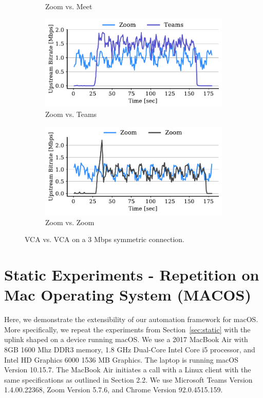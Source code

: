 \begin{figure}[]
\begin{subfigure}[t]{.4\textwidth}
    \caption{Zoom vs. Meet}
    \label{subfig:zoom-meet-3}
\end{subfigure}
\begin{subfigure}[t]{.4\textwidth}
    \centering
    \includegraphics[width=1\textwidth]{figures/appendix/zoom_teams_3_ul_r2.pdf}
    \caption{Zoom vs. Teams}
    \label{subfig:zoom-teams-3}
\end{subfigure}
\begin{subfigure}[t]{.4\textwidth}
    \centering
    \includegraphics[width=1\textwidth]{figures/appendix/zoom_zoom_3_ul_r1.pdf}
    \caption{Zoom vs. Zoom}
    \label{subfig:zoom-zoom-3}
\end{subfigure}
\caption{VCA vs. VCA on a 3 Mbps symmetric connection.}
\label{fig:vca-vca-3}
\end{figure}

\section{Static Experiments - Repetition on Mac Operating System (MACOS)}
\label{appendix:static}
Here, we demonstrate the extensibility of our automation framework for macOS. More specifically, we repeat the experiments from Section~\ref{sec:static} with the uplink shaped on a device running macOS. We use a 2017 MacBook Air with 8GB 1600 Mhz DDR3 memory, 1.8 GHz Dual-Core Intel Core i5 processor, and Intel HD Graphics 6000 1536 MB Graphics. The laptop is running macOS Version 10.15.7. The MacBook Air initiates a call with a Linux client with the same specifications as outlined in Section 2.2. We use Microsoft Teams Version 
1.4.00.22368, Zoom Version 5.7.6, and Chrome Version 92.0.4515.159. 

